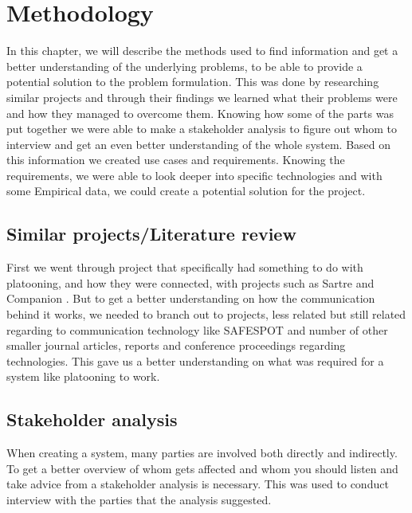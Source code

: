 \section{Methodology}\label{sec:methodology}
% 
In this chapter, we will describe the methods used to find information and get a better understanding of the underlying problems, to be able to provide a potential solution to the problem formulation. This was done by researching similar projects and through their findings we learned what their problems were and how they managed to overcome them. Knowing how some of the parts was put together we were able to make a stakeholder analysis to figure out whom to interview and get an even better understanding of the whole system. Based on this information we created use cases and requirements. Knowing the requirements, we were able to look deeper into specific technologies and with some Empirical data, we could create a potential solution for the project. 
% 
\subsection{Similar projects/Literature review}
First we went through project that specifically had something to do with platooning, and how they were connected, with projects such as Sartre \cite{Chan2012ProjectSARTRE} and Companion \cite{2016CompanionProject}. But to get a better understanding on how the communication behind it works, we needed to branch out to projects, less related but still related regarding to communication technology like SAFESPOT \cite{Safespot} and number of other smaller journal articles, reports and conference proceedings regarding technologies. This gave us a better understanding on what was required for a system like platooning to work.
% 
\subsection{Stakeholder analysis}
When creating a system, many parties are involved both directly and indirectly. To get a better overview of whom gets affected and whom you should listen and take advice from a stakeholder analysis is necessary. This was used to conduct interview with the parties that the analysis suggested. 
% 
